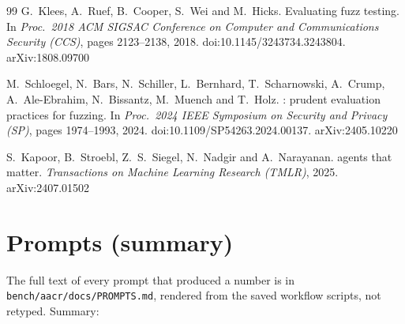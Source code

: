 \documentclass[11pt,a4paper]{article}
\newcommand{\code}[1]{\texttt{#1}}
\begin{document}
\begin{thebibliography}{99}
G.~Klees, A.~Ruef, B.~Cooper, S.~Wei and M.~Hicks.
\newblock Evaluating fuzz testing.
\newblock In \emph{Proc.\ 2018 ACM SIGSAC Conference on Computer and
Communications Security (CCS)}, pages 2123--2138, 2018.
\newblock doi:10.1145/3243734.3243804. arXiv:1808.09700

M.~Schloegel, N.~Bars, N.~Schiller, L.~Bernhard, T.~Scharnowski, A.~Crump,
A.~Ale-Ebrahim, N.~Bissantz, M.~Muench and T.~Holz.
: prudent evaluation practices for fuzzing.
\newblock In \emph{Proc.\ 2024 IEEE Symposium on Security and Privacy (SP)},
pages 1974--1993, 2024.
\newblock doi:10.1109/SP54263.2024.00137. arXiv:2405.10220

S.~Kapoor, B.~Stroebl, Z.~S.~Siegel, N.~Nadgir and A.~Narayanan.
 agents that matter.
\newblock \emph{Transactions on Machine Learning Research (TMLR)}, 2025.
\newblock arXiv:2407.01502

\end{thebibliography}
\normalsize

\appendix

\section{Prompts (summary)}
\label{app:prompts}
\sloppy

The full text of every prompt that produced a number is in
\code{bench/aacr/docs/PROMPTS.md}, rendered from the saved workflow
scripts, not retyped. Summary:
\end{document}
